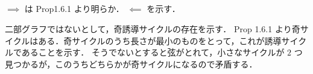 \subsection{}
$\implies$ は Prop1.6.1 より明らか．
$\impliedby$ を示す．

二部グラフではないとして，奇誘導サイクルの存在を示す．
Prop 1.6.1 より奇サイクルはある．奇サイクルのうち長さが最小のものをとって，これが誘導サイクルであることを示す．
そうでないとすると弦がとれて，小さなサイクルが $2$ つ見つかるが，このうちどちらかが奇サイクルになるので矛盾する．